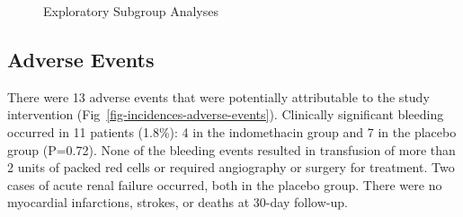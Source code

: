 \documentclass[
  10pt,
  letterpaper,
]{article}
\begin{document}
\begin{figure}


\caption{\label{fig-exploratory-subgroup}Exploratory Subgroup Analyses}

\end{figure}%

\subsection{Adverse Events}\label{adverse-events-1}

There were 13 adverse events that were potentially attributable to the
study intervention (Fig~\ref{fig-incidences-adverse-events}). Clinically
significant bleeding occurred in 11 patients (1.8\%): 4 in the
indomethacin group and 7 in the placebo group (P=0.72). None of the
bleeding events resulted in transfusion of more than 2 units of packed
red cells or required angiography or surgery for treatment. Two cases of
acute renal failure occurred, both in the placebo group. There were no
myocardial infarctions, strokes, or deaths at 30-day follow-up.
\end{document}
